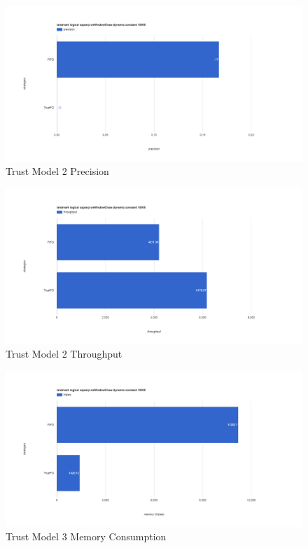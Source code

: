 \begin{figure}[!htbp]
	\centering
    \includegraphics[width=\textwidth]{img/app3-trust-2-p.png}
    \caption{Trust Model 2 Precision}
\end{figure}
\begin{figure}[!htbp]
	\centering
    \includegraphics[width=\textwidth]{img/app3-trust-2-t.png}
    \caption{Trust Model 2 Throughput}
\end{figure}
\begin{figure}[!htbp]
	\centering
    \includegraphics[width=\textwidth]{img/app3-trust-3-m.png}
    \caption{Trust Model 3 Memory Consumption}
\end{figure}
